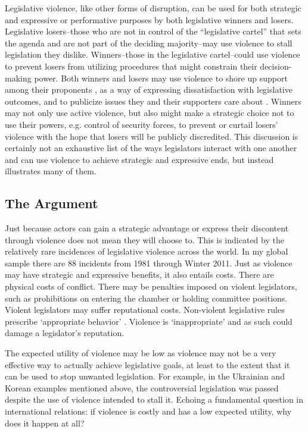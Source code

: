 \documentclass[a4paper]{article}\usepackage[]{graphicx}\usepackage[]{color}
\begin{document}
Legislative violence, like other forms of disruption, can be used for both strategic \citep[see][]{Beaulieu2008,BeaulieuForthcoming} and expressive or performative \citep[see][]{Rai2013,Spary2013} purposes by both legislative winners and losers. Legislative losers--those who are not in control of the ``legislative cartel''  that sets the agenda \citep{cox2007} and are not part of the deciding majority--may use violence to stall legislation they dislike. Winners--those in the legislative cartel--could use violence to prevent losers from utilizing procedures that might constrain their decision-making power. Both winners and losers may use violence to shore up support among their proponents \citep{wilkinson2006}, as a way of expressing dissatisfaction with legislative outcomes, and to publicize issues they and their supporters care about \citep{Spary2013}. Winners may not only use active violence, but also might make a strategic choice not to use their powers, e.g. control of security forces, to prevent or curtail losers' violence \citep[see the work on ethnic violence in India by][]{wilkinson2006} with the hope that losers will be publicly discredited. This discussion is certainly not an exhaustive list of the ways legislators interact with one another and can use violence to achieve strategic and expressive ends, but instead illustrates many of them.

\subsection{The Argument}

Just because actors can gain a strategic advantage or express their discontent through violence does not mean they will choose to. This is indicated by the relatively rare incidences of legislative violence across the world. In my global sample there are 88 incidents from 1981 through Winter 2011. Just as violence may have strategic and expressive benefits, it also entails costs. There are physical costs of conflict. There may be penalties imposed on violent legislators, such as prohibitions on entering the chamber or holding committee positions. Violent legislators may suffer reputational costs. Non-violent legislative rules prescribe `appropriate behavior' \citep{March2008}. Violence is `inappropriate' and as such could damage a legislator's reputation. 

The expected utility of violence may be low as violence may not be a very effective way to actually achieve legislative goals, at least to the extent that it can be used to stop unwanted legislation. For example, in the Ukrainian and Korean examples mentioned above, the controversial legislation was passed despite the use of violence intended to stall it. Echoing a fundamental question in international relations: if violence is costly and has a low expected utility, why does it happen at all? 
\end{document}
